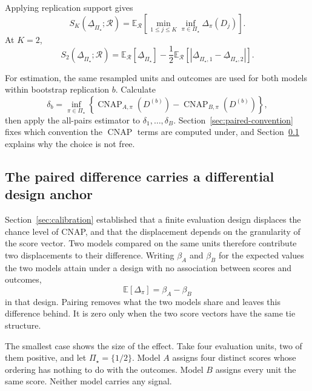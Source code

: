 \documentclass[11pt]{article}
\newcommand{\CNAP}{\operatorname{CNAP}}
\newcommand{\Regime}{\mathcal{R}}
\newcommand{\PSet}{\Pi_\star}
\newcommand{\E}{\mathbb{E}}
\newcommand{\RobDelta}{\underline{\Delta}_{\PSet}}
\theoremstyle{remark}
\begin{document}
Applying replication support gives
\begin{equation}
S_K(\RobDelta;\Regime)
=
\E_{\Regime}
\left[
\min_{1\leq j\leq K}
\inf_{\pi\in\PSet}
\Delta_\pi(D_j)
\right].
\label{eq:robust-paired-support}
\end{equation}
At $K=2$,
\begin{equation}
S_2(\RobDelta;\Regime)
=
\E_{\Regime}[\RobDelta]
-
\frac12
\E_{\Regime}
\left[
|\underline{\Delta}_{\PSet,1}-\underline{\Delta}_{\PSet,2}|
\right].
\label{eq:robust-paired-k2}
\end{equation}

For estimation, the same resampled units and outcomes are used for both models within bootstrap replication $b$. Calculate
\[
\delta_b
=
\inf_{\pi\in\PSet}
\left\{
\CNAP_{A,\pi}(D^{(b)})
-
\CNAP_{B,\pi}(D^{(b)})
\right\},
\]
then apply the all-pairs estimator to $\delta_1,\ldots,\delta_B$. Section~\ref{sec:paired-convention} fixes which convention the $\CNAP$ terms are computed under, and Section~\ref{sec:paired-anchor} explains why the choice is not free.

\subsection{The paired difference carries a differential design anchor}
\label{sec:paired-anchor}

Section~\ref{sec:calibration} established that a finite evaluation design displaces the chance level of CNAP, and that the displacement depends on the granularity of the score vector. Two models compared on the same units therefore contribute two displacements to their difference. Writing $\beta_A$ and $\beta_B$ for the expected values the two models attain under a design with no association between scores and outcomes,
\[
\E[\Delta_\pi]
=
\beta_A-\beta_B
\]
in that design. Pairing removes what the two models share and leaves this difference behind. It is zero only when the two score vectors have the same tie structure.

The smallest case shows the size of the effect. Take four evaluation units, two of them positive, and let $\PSet=\{1/2\}$. Model $A$ assigns four distinct scores whose ordering has nothing to do with the outcomes. Model $B$ assigns every unit the same score. Neither model carries any signal.
\end{document}
